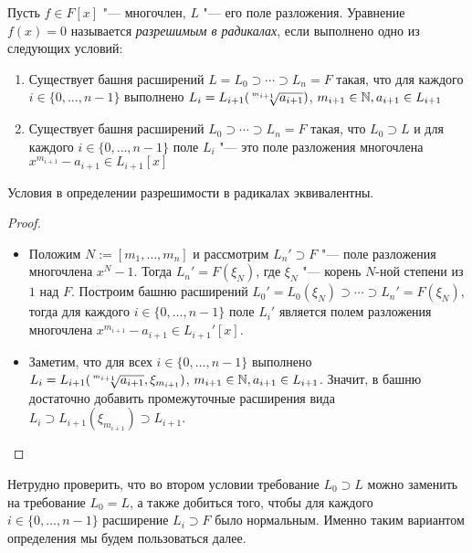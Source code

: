 \begin{definition}
	Пусть $f \in F[x]$ "--- многочлен, $L$ "--- его поле разложения. Уравнение $f(x) = 0$ называется \textit{разрешимым в радикалах}, если выполнено одно из следующих условий:
	\begin{enumerate}
		\item Существует башня расширений $L = L_0 \supset \dotsb \supset L_n = F$ такая, что для каждого $i \in \{0, \dotsc, n - 1\}$ выполнено $L_{i} = L_{i + 1}(\sqrt[\leftroot{2}\uproot{4}m_{i + 1}]{a_{i + 1}})$, $m_{i + 1} \in \mathbb{N}, a_{i + 1} \in L_{i + 1}$
		\item Существует башня расширений $L_0 \supset \dotsb \supset L_n = F$ такая, что $L_0 \supset L$ и для каждого $i \in \{0, \dotsc, n - 1\}$ поле $L_{i}$ "--- это поле разложения многочлена $x^{m_{i + 1}} - a_{i + 1} \in L_{i + 1}[x]$
	\end{enumerate}
\end{definition}

\begin{proposition}
	Условия в определении разрешимости в радикалах эквивалентны.
\end{proposition}

\begin{proof}~
	\begin{itemize}
		\item{}Положим $N := [m_1, \dotsc, m_n]$ и рассмотрим $L_n' \supset F$ "--- поле разложения многочлена $x^N - 1$. Тогда $L_n' = F(\xi_N)$, где $\xi_N$ "--- корень $N$-ной степени из $1$ над $F$. Построим башню расширений $L_0' = L_0(\xi_N) \supset \dotsb \supset L_n' = F(\xi_N)$, тогда для каждого $i \in \{0, \dotsc, n - 1\}$ поле $L_{i}'$ является полем разложения многочлена $x^{m_{i+1}} - a_{i+1} \in L_{i+1}'[x]$.
		\item{}Заметим, что для всех $i \in \{0, \dotsc, n - 1\}$ выполнено $L_{i} = L_{i+1}(\sqrt[\leftroot{2}\uproot{4}m_{i+1}]{a_{i+1}}, \xi_{m_{i + 1}})$, $m_{i+1} \in \mathbb{N}, a_{i+1} \in L_{i+1}$. Значит, в башню достаточно добавить промежуточные расширения вида $L_{i} \supset L_{i + 1}(\xi_{m_{i + 1}}) \supset L_{i + 1}$.\qedhere
	\end{itemize}
\end{proof}

\begin{note}
	Нетрудно проверить, что во втором условии требование $L_0 \supset L$ можно заменить на требование $L_0 = L$, а также добиться того, чтобы для каждого $i \in \{0, \dotsc, n - 1\}$ расширение $L_i \supset F$ было нормальным. Именно таким вариантом определения мы будем пользоваться далее.
\end{note}

